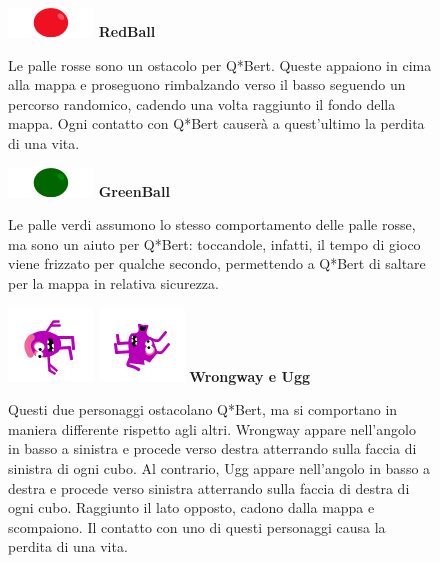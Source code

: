 \documentclass[a4paper,12pt, hidelinks]{report}
\begin{document}
\begin{figure}[H]
		\item
		\includegraphics[width=0.15\linewidth]{img/RedBall}
		\label{img:RedBall}
		\textbf{RedBall}
		
		Le palle rosse sono un ostacolo per Q*Bert. Queste appaiono in cima alla mappa e proseguono rimbalzando verso il basso seguendo un percorso randomico, cadendo una volta raggiunto il fondo della mappa. Ogni contatto con Q*Bert causerà a quest'ultimo la perdita di una vita.
		
\end{figure}

\begin{figure}[H]
		\item
		\includegraphics[width=0.15\linewidth]{img/GreenBall}
		\label{img:GreenBall}
		\textbf{GreenBall}
		
		Le palle verdi assumono lo stesso comportamento delle palle rosse, ma sono un aiuto per Q*Bert: toccandole, infatti, il tempo di gioco viene frizzato per qualche secondo, permettendo a Q*Bert di saltare per la mappa in relativa sicurezza.
		
\end{figure}

\begin{figure}[H]
		\item
		\includegraphics[width=0.15\linewidth]{img/Wrongway}
		\includegraphics[width=0.15\linewidth]{img/Ugg}
		\label{img:Wrongway&Ugg}
		\textbf{Wrongway e Ugg}
		
		Questi due personaggi ostacolano Q*Bert, ma si comportano in maniera differente rispetto agli altri. Wrongway appare nell'angolo in basso a sinistra e procede verso destra atterrando sulla faccia di sinistra di ogni cubo. Al contrario, Ugg appare nell'angolo in basso a destra e procede verso sinistra atterrando sulla faccia di destra di ogni cubo. Raggiunto il lato opposto, cadono dalla mappa e scompaiono. Il contatto con uno di questi personaggi causa la perdita di una vita.
		
\end{figure}
\end{document}
